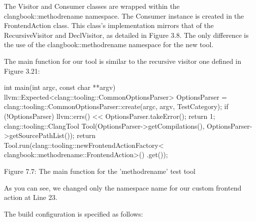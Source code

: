 The Visitor and Consumer classes are wrapped within the clangbook::methodrename namespace. The Consumer instance is created in the FrontendAction class. This class's implementation mirrors that of the RecursiveVisitor and DeclVisitor, as detailed in Figure 3.8. The only difference is the use of the clangbook::methodrename namespace for the new tool.


The main function for our tool is similar to the recursive visitor one defined in Figure 3.21:

\begin{cpp}
int main(int argc, const char **argv) {
  llvm::Expected<clang::tooling::CommonOptionsParser> OptionsParser =
    clang::tooling::CommonOptionsParser::create(argc, argv, TestCategory);
  if (!OptionsParser) {
    llvm::errs() << OptionsParser.takeError();
    return 1;
  }
  clang::tooling::ClangTool Tool(OptionsParser->getCompilations(),
                                 OptionsParser->getSourcePathList());
   return Tool.run(clang::tooling::newFrontendActionFactory<
                   clangbook::methodrename::FrontendAction>()
                   .get());
}
\end{cpp}

\begin{center}
Figure 7.7: The main function for the 'methodrename' test tool
\end{center}

As you can see, we changed only the namespace name for our custom frontend action at Line 23.

The build configuration is specified as follows:


